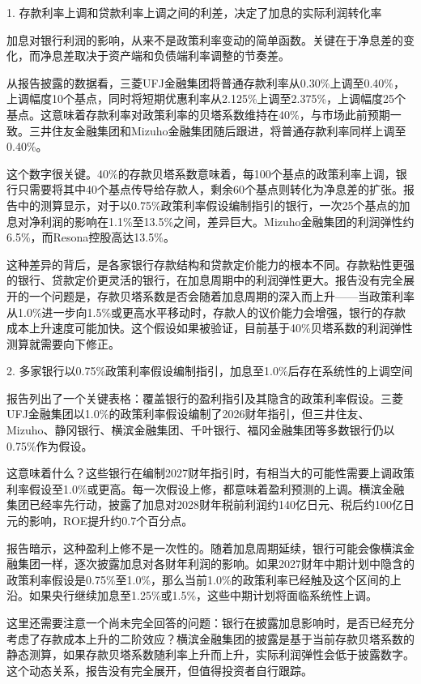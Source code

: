 \documentclass[11pt]{ctexart}
\begin{document}
1. 存款利率上调和贷款利率上调之间的利差，决定了加息的实际利润转化率

加息对银行利润的影响，从来不是政策利率变动的简单函数。关键在于净息差的变化，而净息差取决于资产端和负债端利率调整的节奏差。

从报告披露的数据看，三菱UFJ金融集团将普通存款利率从0.30\%上调至0.40\%，上调幅度10个基点，同时将短期优惠利率从2.125\%上调至2.375\%，上调幅度25个基点。这意味着存款利率对政策利率的贝塔系数维持在40\%，与市场此前预期一致。三井住友金融集团和Mizuho金融集团随后跟进，将普通存款利率同样上调至0.40\%。

这个数字很关键。40\%的存款贝塔系数意味着，每100个基点的政策利率上调，银行只需要将其中40个基点传导给存款人，剩余60个基点则转化为净息差的扩张。报告中的测算显示，对于以0.75\%政策利率假设编制指引的银行，一次25个基点的加息对净利润的影响在1.1\%至13.5\%之间，差异巨大。Mizuho金融集团的利润弹性约6.5\%，而Resona控股高达13.5\%。

这种差异的背后，是各家银行存款结构和贷款定价能力的根本不同。存款粘性更强的银行、贷款定价更灵活的银行，在加息周期中的利润弹性更大。报告没有完全展开的一个问题是，存款贝塔系数是否会随着加息周期的深入而上升——当政策利率从1.0\%进一步向1.5\%或更高水平移动时，存款人的议价能力会增强，银行的存款成本上升速度可能加快。这个假设如果被验证，目前基于40\%贝塔系数的利润弹性测算就需要向下修正。

2. 多家银行以0.75\%政策利率假设编制指引，加息至1.0\%后存在系统性的上调空间

报告列出了一个关键表格：覆盖银行的盈利指引及其隐含的政策利率假设。三菱UFJ金融集团以1.0\%的政策利率假设编制了2026财年指引，但三井住友、Mizuho、静冈银行、横滨金融集团、千叶银行、福冈金融集团等多数银行仍以0.75\%作为假设。

这意味着什么？这些银行在编制2027财年指引时，有相当大的可能性需要上调政策利率假设至1.0\%或更高。每一次假设上修，都意味着盈利预测的上调。横滨金融集团已经率先行动，披露了加息对2028财年税前利润约140亿日元、税后约100亿日元的影响，ROE提升约0.7个百分点。

报告暗示，这种盈利上修不是一次性的。随着加息周期延续，银行可能会像横滨金融集团一样，逐次披露加息对各财年利润的影响。如果2027财年中期计划中隐含的政策利率假设是0.75\%至1.0\%，那么当前1.0\%的政策利率已经触及这个区间的上沿。如果央行继续加息至1.25\%或1.5\%，这些中期计划将面临系统性上调。

这里还需要注意一个尚未完全回答的问题：银行在披露加息影响时，是否已经充分考虑了存款成本上升的二阶效应？横滨金融集团的披露是基于当前存款贝塔系数的静态测算，如果存款贝塔系数随利率上升而上升，实际利润弹性会低于披露数字。这个动态关系，报告没有完全展开，但值得投资者自行跟踪。
\end{document}
